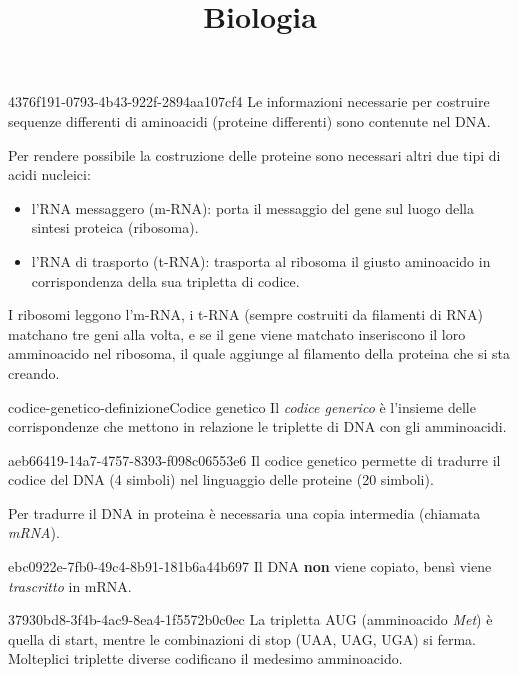 \documentclass[preview]{standalone}
\begin{document}
\title{Biologia}
\genpage

\begin{snippet}{4376f191-0793-4b43-922f-2894aa107cf4}
    Le informazioni necessarie per costruire sequenze
    differenti di aminoacidi (proteine differenti) sono
    contenute nel DNA.
    
    Per rendere possibile la costruzione delle proteine sono
    necessari altri due tipi di acidi nucleici:
    
    \begin{itemize}
        \item l'RNA messaggero (m-RNA): porta il messaggio del
            gene sul luogo della sintesi proteica (ribosoma).
        \item l'RNA di trasporto (t-RNA): trasporta al ribosoma il
            giusto aminoacido in corrispondenza della sua
            tripletta di codice.
    \end{itemize}
    
    I ribosomi leggono l'm-RNA, i t-RNA (sempre costruiti da filamenti di RNA)
    matchano tre geni alla volta, e se il gene
    viene matchato inseriscono il loro amminoacido nel ribosoma, il quale
    aggiunge al filamento della proteina che si sta creando.
\end{snippet}


\begin{snippetdefinition}{codice-genetico-definizione}{Codice genetico}
    Il \textit{codice generico} è l'insieme
    delle corrispondenze che mettono in
    relazione le triplette di DNA con gli amminoacidi.
\end{snippetdefinition}

\begin{snippet}{aeb66419-14a7-4757-8393-f098c06553e6}
    Il codice genetico permette di tradurre il codice del DNA
    (4 simboli) nel linguaggio delle proteine (20 simboli).


    Per tradurre il DNA in proteina è necessaria una copia intermedia
    (chiamata \textit{mRNA}).
\end{snippet}

\begin{snippetnote}{ebc0922e-7fb0-49c4-8b91-181b6a44b697}{}
    Il DNA \textbf{non} viene copiato, bensì viene
    \textit{trascritto} in mRNA.
\end{snippetnote}

\begin{snippet}{37930bd8-3f4b-4ac9-8ea4-1f5572b0c0ec}
    La tripletta AUG (amminoacido \textit{Met}) è quella di start,
    mentre le combinazioni di stop (UAA, UAG, UGA) si ferma.
    Molteplici triplette diverse codificano il medesimo amminoacido.
\end{snippet}
\end{document}
